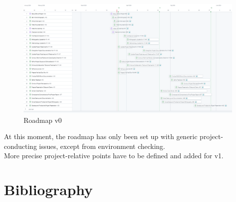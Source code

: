 \documentclass[12pt]{article}
\begin{document}
\vspace{1cm}
\begin{figure}[h]
    \centering
    \includegraphics[width=\textwidth]{../../roadmap/roadmapv0-full.png}
    \caption{Roadmap v0}
    \label{fig:roadmapv0}
\end{figure}
\vspace{1cm}
At this moment, the roadmap has only been set up with generic project-conducting issues,
except from environment checking.\\
More precise project-relative points have to be defined and added for v1.

\newpage
\section{Bibliography}
\nocite{*}
\printbibliography[heading=none]
\end{document}
